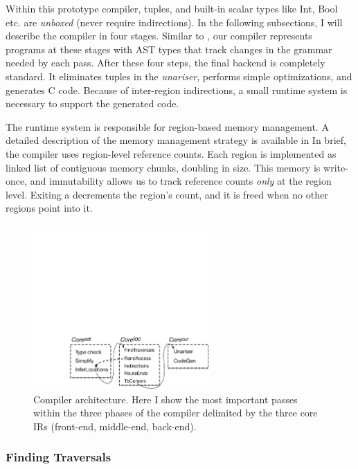 Within this prototype compiler, tuples, and built-in scalar types like Int, Bool
etc. are \emph{unboxed} (never require indirections).
%
In the following subsections, I will describe the
compiler in four stages.
{Similar to \lamcur, our compiler represents
  programs at these stages with AST types that track changes in the
  grammar needed by each pass.
  After these four steps,}
  the final backend is completely standard.  It eliminates
tuples in the \emph{unariser},
performs simple optimizations, and generates C code.
%
Because of inter-region indirections, a small \ourcalc runtime system is
necessary to support the generated code.

The \ourcalc runtime system is responsible for region-based memory management.
A detailed description of the memory management strategy is available in  %
In brief, the compiler uses region-level reference counts.  Each region is implemented as
linked list of contiguous memory chunks, doubling in size.  This memory is write-once,
and immutability allows us to track reference counts \emph{only} at the region
level.  Exiting a  decrements the region's count, and it is freed
when no other regions point into it.

\begin{figure}\center
  \includegraphics[width=0.6\textwidth]{compiler_arch}
  \caption{Compiler architecture.  Here I show the most important
    passes within the three phases of the compiler delimited by
    the three core IRs (front-end, middle-end, back-end).}
  \label{fig:compiler-arch}
\end{figure}

\subsubsection{Finding Traversals}
\label{sec:find-traversal}


